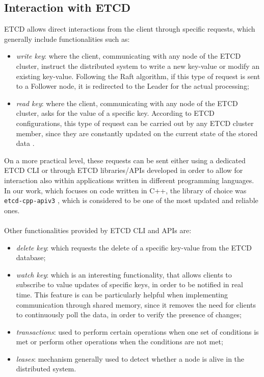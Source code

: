 \subsection{Interaction with ETCD}\label{ETCD-interaction}
ETCD allows direct interactions from the client through specific requests, which generally include functionalities \cite{site:etcd-doc} such as:
\begin{itemize}
	\item \textit{write key}: where the client, communicating with any node of the ETCD cluster, instruct the distributed system to write a new key-value or modify an existing key-value. Following the Raft algorithm, if this type of request is sent to a Follower node, it is redirected to the Leader for the actual processing;
	\item \textit{read key}: where the client, communicating with any node of the ETCD cluster, asks for the value of a specific key. According to ETCD configurations, this type of request can be carried out by any ETCD cluster member, since they are constantly updated on the current state of the stored data \cite{site:etcd-faq}.
\end{itemize}
On a more practical level, these requests can be sent either using a dedicated ETCD CLI or through ETCD libraries/APIs developed in order to allow for interaction also within applications written in different programming languages. In our work, which focuses on code written in C++, the library of choice was \texttt{etcd-cpp-apiv3} \cite{site:etcd-cpp-apiv3}, which is considered to be one of the most updated and reliable ones. \\ \\
Other functionalities \cite{site:etcd-doc} provided by ETCD CLI and APIs are:
\begin{itemize}
	\item \textit{delete key}: which requests the delete of a specific key-value from the ETCD database;
	\item \textit{watch key}: which is an interesting functionality, that allows clients to subscribe to value updates of specific keys, in order to be notified in real time. This feature is can be particularly helpful when implementing communication through shared memory, since it removes the need for clients to continuously poll the data, in order to verify the presence of changes;
	\item \textit{transactions}: used to perform certain operations when one set of conditions is met or perform other operations when the conditions are not met;
	\item \textit{leases}: mechanism generally used to detect whether a node is alive in the distributed system.
\end{itemize}
